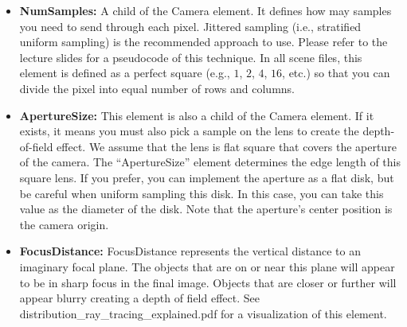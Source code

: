 \documentclass[12pt]{article}
\begin{document}
\begin{itemize}

\item \textbf{NumSamples:} A child of the Camera element. It defines how
may samples you need to send through each pixel. Jittered sampling
(i.e., stratified uniform sampling) is the recommended approach to use.
Please refer to the lecture slides for a pseudocode of this technique.
In all scene files, this element is defined as a perfect square (e.g.,
        $1$, $2$, $4$, $16$, etc.) so that
you can divide the pixel into equal number of rows and columns.

\item \textbf{ApertureSize:} This element is also a child of the Camera
element. If it exists, it means you must also pick a sample on the lens
to create the depth-of-field effect. We assume that the lens is flat
square that covers the aperture of the camera.  The ``ApertureSize''
element determines the edge length of this square lens. If you prefer,
you can implement the aperture as a flat disk, but be careful when
uniform sampling this disk. In this case, you can take this value as the
diameter of the disk. Note that the aperture's center position is the camera origin. 

\item \textbf{FocusDistance:} FocusDistance represents the vertical
distance to an imaginary focal plane. The objects that are on or near
this plane will appear to be in sharp focus in the final image. Objects
that are closer or further will appear blurry creating a depth of field
effect. See distribution\_ray\_tracing\_explained.pdf for a
visualization of this element.



\end{itemize}
\end{document}
